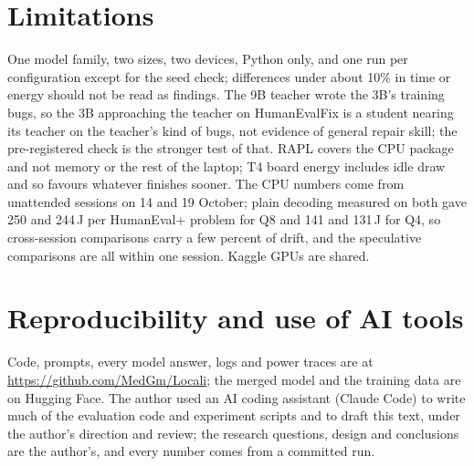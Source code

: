 \documentclass[11pt]{article}
\begin{document}
\section{Limitations}

One model family, two sizes, two devices, Python only, and one run per configuration except for the
seed check; differences under about 10\% in time or energy should not be read as findings. The 9B
teacher wrote the 3B's training bugs, so the 3B approaching the teacher on HumanEvalFix is a student
nearing its teacher on the teacher's kind of bugs, not evidence of general repair skill; the
pre-registered check is the stronger test of that.
RAPL covers the CPU package and not memory or the rest of the laptop; T4 board energy includes idle
draw and so favours whatever finishes sooner. The CPU numbers come from unattended sessions on
14 and 19 October; plain decoding measured on both gave 250 and 244\,J per HumanEval+ problem for
Q8 and 141 and 131\,J for Q4, so cross-session comparisons carry a few percent of drift, and the
speculative comparisons are all within one session. Kaggle GPUs are shared.

\section*{Reproducibility and use of AI tools}

Code, prompts, every model answer, logs and power traces are at
\url{https://github.com/MedGm/Locali}; the merged model and the training data are on Hugging Face.
The author used an AI coding assistant (Claude Code) to write much of the evaluation code and
experiment scripts and to draft this text, under the author's direction and review; the research
questions, design and conclusions are the author's, and every number comes from a committed run.



\end{document}
